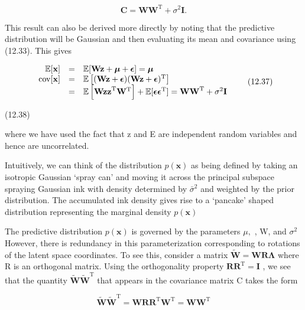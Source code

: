 \documentclass[
  10
]{article}
\begin{document}
\[
\mathbf {C} = \mathbf {W W ^ {\mathrm{T}}} + \sigma^ {2} \mathbf {I}.\tag{12.36}
\]

This result can also be derived more directly by noting that the
predictive distribution will be Gaussian and then evaluating its mean
and covariance using (12.33). This gives

\[
\begin{array}{r c l} \mathbb {E} [ \mathbf {x} ] & = & \mathbb {E} [ \mathbf {W z} + \boldsymbol {\mu} + \boldsymbol {\epsilon} ] = \boldsymbol {\mu} \\ \operatorname{cov} [ \mathbf {x} ] & = & \mathbb {E} \left[ (\mathbf {W z} + \boldsymbol {\epsilon}) (\mathbf {W z} + \boldsymbol {\epsilon}) ^ {\mathrm{T}} \right] \\ & = & \mathbb {E} \left[ \mathbf {W z z} ^ {\mathrm{T}} \mathbf {W} ^ {\mathrm{T}} \right] + \mathbb {E} [ \boldsymbol {\epsilon} \boldsymbol {\epsilon} ^ {\mathrm{T}} ] = \mathbf {W W} ^ {\mathrm{T}} + \sigma^ {2} \mathbf {I} \end{array}\tag{12.37}
\]

(12.38)

where we have used the fact that z and E are independent random
variables and hence are uncorrelated.

Intuitively, we can think of the distribution \(p ( \mathbf { x } )\) as
being defined by taking an isotropic Gaussian `spray can' and moving it
across the principal subspace spraying Gaussian ink with density
determined by \(\bar { \sigma } ^ { 2 }\) and weighted by the prior
distribution. The accumulated ink density gives rise to a `pancake'
shaped distribution representing the marginal density
\(p ( \mathbf { x } )\)

The predictive distribution \(p ( \mathbf { x } )\) is governed by the
parameters \(\mu ,\) , W, and \(\sigma ^ { 2 }\) However, there is
redundancy in this parameterization corresponding to rotations of the
latent space coordinates. To see this, consider a matrix
\(\mathbf { \tilde { W } } = \mathbf { W } \mathbf { R } \mathbf { \Lambda }\)
where R is an orthogonal matrix. Using the orthogonality property
\(\mathbf { R } \mathbf { R } ^ { \mathrm { T } } = \mathbf { I }\) , we
see that the quantity
\(\widetilde { \mathbf { W } } \widetilde { \mathbf { W } } ^ { \mathrm { T } }\)
that appears in the covariance matrix C takes the form

\[
\widetilde {\mathbf {W}} \widetilde {\mathbf {W}} ^ {\mathrm{T}} = \mathbf {W} \mathbf {R} \mathbf {R} ^ {\mathrm{T}} \mathbf {W} ^ {\mathrm{T}} = \mathbf {W} \mathbf {W} ^ {\mathrm{T}}\tag{12.39}
\]
\end{document}
